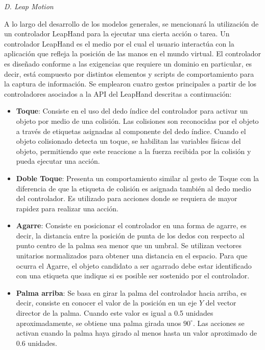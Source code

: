 \documentclass[conference]{IEEEtran}
\begin{document}
\textit{D. Leap Motion}
\medskip

A lo largo del desarrollo de los modelos generales, se mencionará la utilización de un controlador LeapHand para la ejecutar una cierta acción o tarea. Un controlador LeapHand es el medio por el cual el usuario interactúa con la aplicación que refleja la posición de las manos en el mundo virtual. El controlador es diseñado conforme a las exigencias que requiere un dominio en particular, es decir, está compuesto por distintos elementos y scripts de comportamiento para la captura de información. Se emplearon cuatro gestos principales a partir de los controladores asociados a la API del LeapHand descritas a continuación:

\begin{itemize}
\item \textbf{Toque}: Consiste en el uso del dedo índice del controlador para activar un objeto por medio de una colisión. Las colisiones son reconocidas por el objeto a través de etiquetas asignadas al componente del dedo índice. Cuando el objeto colisionado detecta un toque, se habilitan las variables físicas del objeto, permitiendo que este reaccione a la fuerza recibida por la colisión y pueda ejecutar una acción.
\item \textbf{Doble Toque}: Presenta un comportamiento similar al gesto de Toque con la diferencia de que la etiqueta de colisión es asignada también al dedo medio del controlador. Es utilizado para acciones donde se requiera de mayor rapidez para realizar una acción. 
\item \textbf{Agarre}: Consiste en posicionar el controlador en una forma de agarre, es decir, la distancia entre la posición de punta de los dedos con respecto al punto centro de la palma sea menor que un umbral. Se utilizan vectores unitarios normalizados para obtener una distancia en el espacio. Para que ocurra el Agarre, el objeto candidato a ser agarrado debe estar identificado con una etiqueta que indique si es posible ser sostenido por el controlador.
\item \textbf{Palma arriba}: Se basa en girar la palma del controlador hacia arriba, es decir, consiste en conocer el valor de la posición en un eje $Y$ del vector director de la palma. Cuando este valor es igual a 0.5 unidades aproximadamente, se obtiene una palma girada unos $90^{\circ}$. Las acciones se activan cuando la palma haya girado al menos hasta un valor aproximado de 0.6 unidades.
 \end{itemize}
\end{document}
